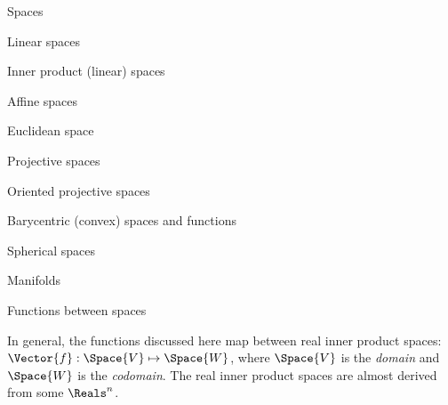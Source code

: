\begin{plSection}{Spaces}
\begin{plSection}{Linear spaces}
\begin{plSection}{Inner product (linear) spaces}
\begin{itemize}
\end{itemize}
\end{plSection}%
\end{plSection}%
\begin{plSection}{Affine spaces}
\label{sec:affine-spaces}
\begin{plSection}{Euclidean space}
\end{plSection}%
\end{plSection}%
\begin{plSection}{Projective spaces}
\label{sec:Projective-spaces}
\begin{plSection}{Oriented projective spaces}
\label{sec:Oriented-projective-spaces}
\end{plSection}%
\end{plSection}%
\begin{plSection}{Barycentric (convex) spaces and functions}
\end{plSection}%
\begin{plSection}{Spherical spaces}
\end{plSection}%
\begin{plSection}{Manifolds}
\label{sec:Manifolds}
\end{plSection}%
\begin{plSection}{Functions between spaces}
\label{sec:Functions-between-spaces}

In general, the functions discussed here map between real inner product spaces:
$\Vector{f}:\Space{V} \mapsto \Space{W}$, where $\Space{V}$ is the
\textit{domain} and $\Space{W}$ is the \textit{codomain}.
The real inner product spaces are almost derived from some $\Reals^n$.


\end{plSection}
\end{plSection}
